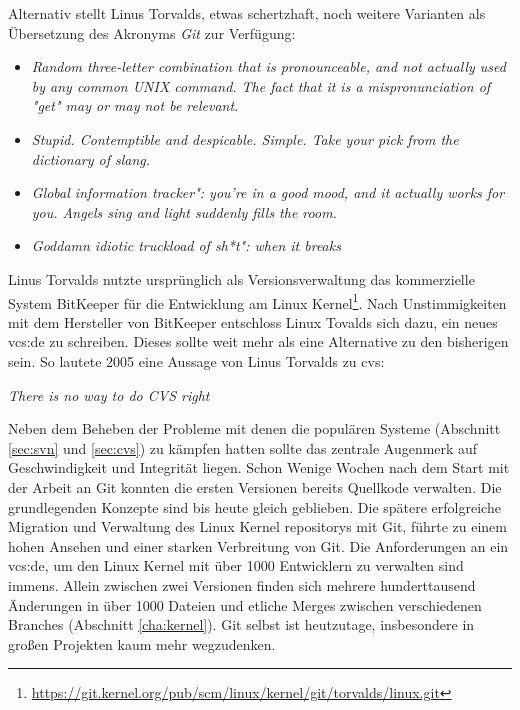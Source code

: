 Alternativ stellt Linus Torvalds, etwas schertzhaft, noch weitere Varianten als Übersetzung des
Akronyms \textit{Git} zur Verf\-ügung\cite{link:gitfaq}:

\begin{itemize}
  \item \textit{\glqq{}Random three-letter combination that is pronounceable, and not
  actually used by any common UNIX command. The fact that it is a
  mispronunciation of "get" may or may not be relevant.\grqq{}}
  \item \textit{\glqq{}Stupid. Contemptible and despicable. Simple. Take your pick from the
  dictionary of slang.\grqq{}}
  \item \textit{\glqq{}Global information tracker": you're in a good mood, and it actually
  works for you. Angels sing and light suddenly fills the room.\grqq{}}
  \item \textit{\glqq{}Goddamn idiotic truckload of sh*t": when it breaks\grqq{}}
\end{itemize}

Linus Torvalds nutzte ursprünglich als Versionsverwaltung das kommerzielle System BitKeeper für
die Entwicklung am Linux
Kernel\footnote{\url{https://git.kernel.org/pub/scm/linux/kernel/git/torvalds/linux.git}}.
Nach Unstimmigkeiten mit dem Hersteller von BitKeeper entschloss Linux Tovalds
sich dazu, ein neues \gls{vcs:de} zu schreiben. Dieses sollte weit mehr als
eine Alternative zu den bisherigen sein\cite[S.~13]{gitosp}. So lautete 2005
eine Aussage von Linus Torvalds zu \acrshort{cvs}\cite[S.~385]{cd}:

\begin{center}
\textit{\glqq{}There is no way to do CVS right\grqq{}}\\
\end{center}

Neben dem Beheben der Probleme mit denen die populären Systeme (Abschnitt
\ref{sec:svn} und \ref{sec:cvs}) zu kämpfen hatten sollte das zentrale
Augenmerk auf Geschwindigkeit und Integrität liegen. Schon Wenige Wochen nach
dem Start mit der Arbeit an Git konnten die ersten Versionen bereits Quellkode
verwalten. Die grundlegenden Konzepte sind bis heute gleich geblieben. Die
spätere erfolgreiche Migration und Verwaltung des Linux Kernel
\glspl{repository} mit Git, führte zu einem hohen Ansehen und einer starken
Verbreitung von Git. Die Anforderungen an ein \acrlong{vcs:de}, um den Linux Kernel
mit über 1000 Entwicklern zu verwalten sind immens. Allein zwischen zwei
Versionen finden sich mehrere hunderttausend Änderungen in über 1000 Dateien
und etliche Merges zwischen verschiedenen Branches (Abschnitt
\ref{cha:kernel}). Git selbst ist heutzutage, insbesondere in großen Projekten
kaum mehr wegzudenken.\cite[S.~13]{gitosp}


